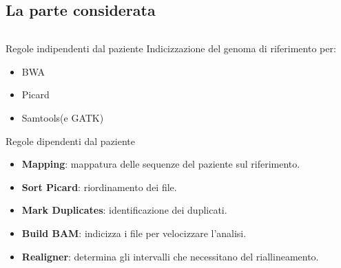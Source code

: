 \documentclass{beamer}
\begin{document}
\subsection{La parte considerata}
\begin{frame}
\begin{columns}
\begin{column}{0.8\linewidth}
\begin{block}{Regole indipendenti dal paziente}
Indicizzazione del genoma di riferimento per:
\begin{itemize}
\item BWA
\item Picard
\item Samtools(e GATK) 
\end{itemize}
\end{block}
\begin{block}{Regole dipendenti dal paziente}
\begin{itemize}
\item \textbf{Mapping}: mappatura delle sequenze del paziente sul riferimento.
\item \textbf{Sort Picard}: riordinamento dei file. 
\item \textbf{Mark Duplicates}: identificazione dei duplicati.
\item \textbf{Build BAM}: indicizza i file per velocizzare l'analisi.
\item \textbf{Realigner}: determina gli intervalli che necessitano del riallineamento.
\end{itemize}
\end{block}
\end{column}
\end{columns}
\end{frame}
\end{document}
